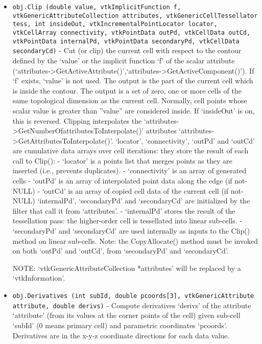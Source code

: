 \begin{itemize}
\item  \verb|obj.Clip (double value, vtkImplicitFunction f, vtkGenericAttributeCollection attributes, vtkGenericCellTessellator tess, int insideOut, vtkIncrementalPointLocator locator, vtkCellArray connectivity, vtkPointData outPd, vtkCellData outCd, vtkPointData internalPd, vtkPointData secondaryPd, vtkCellData secondaryCd)| -  Cut (or clip) the current cell with respect to the contour defined by
 the `value' or the implicit function `f' of the scalar attribute
 (`attributes->GetActiveAttribute()',`attributes->GetActiveComponent()').
 If `f' exists, `value' is not used. The output is the part of the
 current cell which is inside the contour.  The output is a set of zero,
 one or more cells of the same topological dimension as the current
 cell. Normally, cell points whose scalar value is greater than ''value''
 are considered inside. If `insideOut' is on, this is reversed.  Clipping
 interpolates the `attributes->GetNumberOfattributesToInterpolate()'
 attributes `attributes->GetAttributesToInterpolate()'.  `locator',
 `connectivity', `outPd' and `outCd' are cumulative data arrays over cell
 iterations: they store the result of each call to Clip():
 - `locator' is a points list that merges points as they are inserted
 (i.e., prevents duplicates).
 - `connectivity' is an array of generated cells
 - `outPd' is an array of interpolated point data along the edge (if
 not-NULL)
 - `outCd' is an array of copied cell data of the current cell (if
 not-NULL)
 `internalPd', `secondaryPd' and `secondaryCd' are initialized by the
 filter that call it from `attributes'.
 - `internalPd' stores the result of the tessellation pass: the
 higher-order cell is tessellated into linear sub-cells.
 - `secondaryPd' and `secondaryCd' are used internally as inputs to the
 Clip() method on linear sub-cells.
 Note: the CopyAllocate() method must be invoked on both `outPd' and
 `outCd', from `secondaryPd' and `secondaryCd'.

 NOTE: `vtkGenericAttributeCollection *attributes' will be replaced by a
       `vtkInformation'.

 
 
 
 
 
 
 

\item  \verb|obj.Derivatives (int subId, double pcoords[3], vtkGenericAttribute attribute, double derivs)| -  Compute derivatives `derivs' of the attribute `attribute' (from its
 values at the corner points of the cell) given sub-cell `subId' (0 means
 primary cell) and parametric coordinates `pcoords'.
 Derivatives are in the x-y-z coordinate directions for each data value.
 

\end{itemize}
